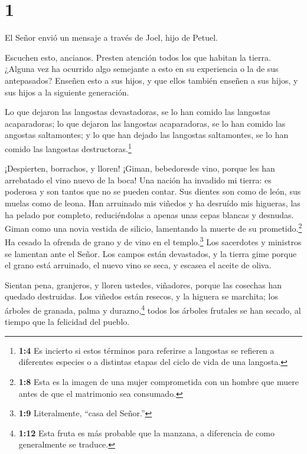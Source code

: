 \hypertarget{section}{%
\section{1}\label{section}}

 El Señor envió un mensaje a través de Joel, hijo de Petuel.

 Escuchen esto, ancianos. Presten atención todos los que
habitan la tierra. ¿Alguna vez ha ocurrido algo semejante a esto en su
experiencia o la de sus antepasados?  Enseñen esto a sus
hijos, y que ellos también enseñen a sus hijos, y sus hijos a la
siguiente generación.

 Lo que dejaron las langostas devastadoras, se lo han comido
las langostas acaparadoras; lo que dejaron las langostas acaparadoras,
se lo han comido las angostas saltamontes; y lo que han dejado las
langostas saltamontes, se lo han comido las langostas
destructoras.\footnote{\textbf{1:4} Es incierto si estos términos para
  referirse a langostas se refieren a diferentes especies o a distintas
  etapas del ciclo de vida de una langosta.}

 ¡Despierten, borrachos, y lloren! ¡Giman, bebedoresde vino,
porque les han arrebatado el vino nuevo de la boca!  Una
nación ha invadido mi tierra: es poderosa y son tantos que no se pueden
contar. Sus dientes son como de león, sus muelas como de leona.
 Han arruinado mis viñedos y ha desruído mis higueras, las
ha pelado por completo, reduciéndolas a apenas unas cepas blancas y
desnudas.  Giman como una novia vestida de silicio,
lamentando la muerte de su prometido.\footnote{\textbf{1:8} Esta es la
  imagen de una mujer comprometida con un hombre que muere antes de que
  el matrimonio sea consumado.}  Ha cesado la ofrenda de
grano y de vino en el templo.\footnote{\textbf{1:9} Literalmente, ``casa
  del Señor.''} Los sacerdotes y ministros se lamentan ante el Señor.
 Los campos están devastados, y la tierra gime porque el
grano está arruinado, el nuevo vino se seca, y escasea el aceite de
oliva.

 Sientan pena, granjeros, y lloren ustedes, viñadores,
porque las cosechas han quedado destruidas.  Los viñedos
están resecos, y la higuera se marchita; los árboles de granada, palma y
durazno,\footnote{\textbf{1:12} Esta fruta es más probable que la
  manzana, a diferencia de como generalmente se traduce.} todos los
árboles frutales se han secado, al tiempo que la felicidad del pueblo.

